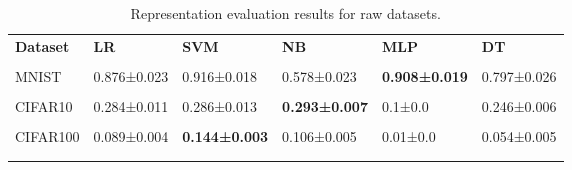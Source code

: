\begin{table}[h]
    \centering
    \footnotesize
    \begin{tabular}{llllll}\n\toprule\n \textbf{Dataset} &          \textbf{LR} &         \textbf{SVM} &          \textbf{NB} &         \textbf{MLP} &          \textbf{DT} \\\\\n\midrule\n    
    MNIST & 0.876±0.023 & 0.916±0.018 & 0.578±0.023 & \textbf{0.908±0.019} & 0.797±0.026 \\\\\n CIFAR10 & 0.284±0.011 & 0.286±0.013 & \textbf{0.293±0.007} &     0.1±0.0 & 0.246±0.006 \\\\\n CIFAR100 & 0.089±0.004 & \textbf{0.144±0.003} & 0.106±0.005 &    0.01±0.0 & 0.054±0.005 \\\\\n\bottomrule\n
    \end{tabular}
    \caption[Representations evaluation for raw datasets]{Representation evaluation results for raw datasets.}
    \label{tab:orig}
\end{table}